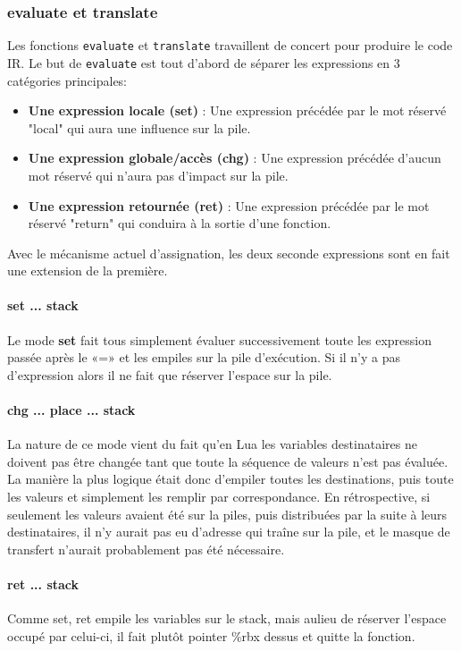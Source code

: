 \documentclass{article}
\begin{document}
\subsubsection{evaluate et translate}
Les fonctions \texttt{evaluate} et \texttt{translate} travaillent de concert pour produire le code IR. Le but de \texttt{evaluate} est tout d'abord de séparer les expressions en 3 catégories principales:
\begin{itemize}
\item \textbf{Une expression locale (set)} : Une expression précédée par le mot réservé "local" qui aura une influence sur la pile.
\item \textbf{Une expression globale/accès (chg)} : Une expression précédée d'aucun mot réservé qui n'aura pas d'impact sur la pile.
\item \textbf{Une expression retournée (ret)} : Une expression précédée par le mot réservé "return" qui conduira à la sortie d'une fonction.
\end{itemize}
Avec le mécanisme actuel d'assignation, les deux seconde expressions sont en fait une extension de la première.
\paragraph{set ... stack}
Le mode \textbf{set} fait tous simplement évaluer successivement toute les expression passée après le «=» et les empiles sur la pile d'exécution. Si il n'y a pas d'expression alors il ne fait que réserver l'espace sur la pile.

\paragraph{chg ... place ... stack}
La nature de ce mode vient du fait qu'en Lua les variables destinataires ne doivent pas être changée tant que toute la séquence de valeurs n'est pas évaluée. La manière la plus logique était donc d'empiler toutes les destinations, puis toute les valeurs et simplement les remplir par correspondance. En rétrospective, si seulement les valeurs avaient été sur la piles, puis distribuées par la suite à leurs destinataires, il n'y aurait pas eu d'adresse qui traîne sur la pile, et le masque de transfert n'aurait probablement pas été nécessaire.

\paragraph{ret ... stack}
Comme set, ret empile les variables sur le stack, mais aulieu de réserver l'espace occupé par celui-ci, il fait plutôt pointer \%{}rbx dessus et quitte la fonction.
\end{document}
